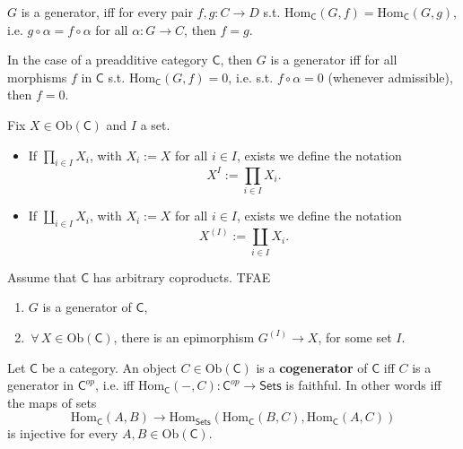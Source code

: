 \begin{rem}
	$G$ is a generator, iff for every pair $f,g: C \to D$
	s.t. $\mathrm{Hom}_{\mathsf{C}} \left( G, f \right) = \mathrm{Hom}_{\mathsf{C}} \left( G, g \right)$,
	i.e. $g \circ \alpha = f \circ \alpha$ for all $\alpha: G \to C$, then $f = g$.

	In the case of a preadditive category $\mathsf{C}$, then $G$ is a generator iff
	for all morphisms $f$ in $\mathsf{C}$ s.t. $\mathrm{Hom}_{\mathsf{C}} \left( G, f \right) = 0$,
	i.e. s.t. $f \circ \alpha = 0$ (whenever admissible), then $f = 0$.
\end{rem}

\begin{defn}
	Fix $X \in \mathrm{Ob} \left(\mathsf{C}\right)$ and $I$ a set.
	\begin{itemize}
		\item If $\prod_{i \in I} X_i$, with $X_i := X$ for all $i \in I$, exists we define the notation
			\begin{equation}
			X^I := \prod_{i \in I} X_i
			.\end{equation} 
		\item If $\coprod_{i \in I} X_i$, with $X_i := X$ for all $i \in I$, exists we define the notation
			\begin{equation}
				X^{(I)} := \coprod_{i \in I} X_i
			.\end{equation} 
	\end{itemize}
\end{defn}

\begin{prop}
	Assume that $\mathsf{C}$ has arbitrary coproducts.
	TFAE
	\begin{enumerate}
		\item $G$ is a generator of $\mathsf{C}$,
		\item $\,\forall\, X \in \mathrm{Ob} \left(\mathsf{C}\right)$, there is an epimorphism
			$G^{(I)} \to X$, for some set $I$.
	\end{enumerate}
\end{prop} 

\begin{defn}
	Let $\mathsf{C}$ be a category.
	An object $C \in \mathrm{Ob} \left(\mathsf{C}\right)$ is a \textbf{cogenerator} of $\mathsf{C}$ iff
	$C$ is a generator in $\mathsf{C}^{op}$, i.e. iff
	$\mathrm{Hom}_{\mathsf{C}} \left( -, C \right): \mathsf{C}^{op} \to \mathsf{Sets}$ is faithful.
	In other words iff the maps of sets
	 \begin{equation}
	\mathrm{Hom}_{\mathsf{C}} \left( A, B \right) \to
	\mathrm{Hom}_{\mathsf{Sets}} \left( \mathrm{Hom}_{\mathsf{C}} \left( B, C \right), 
	\mathrm{Hom}_{\mathsf{C}} \left( A, C \right) \right)
	\end{equation} 
	is injective for every $A, B \in \mathrm{Ob} \left(\mathsf{C}\right)$.
\end{defn}

